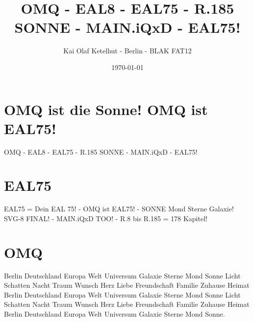 \documentclass[12pt]{article}
\title{OMQ - EAL8 - EAL75 - R.185 SONNE - MAIN.iQxD - EAL75!}
\author{Kai Olaf Ketelhut - Berlin - BLAK FAT12}
\date{\today}
\begin{document}
\maketitle
\section*{OMQ ist die Sonne! OMQ ist EAL75!}
OMQ - EAL8 - EAL75 - R.185 SONNE - MAIN.iQxD - EAL75!

\section*{EAL75}
EAL75 = Dein EAL 75! - OMQ ist EAL75! - SONNE Mond Sterne Galaxie!
SVG-8 FINAL! - MAIN.iQxD TOO! - R.8 bis R.185 = 178 Kapitel!

\section*{OMQ}
Berlin Deutschland Europa Welt Universum Galaxie Sterne Mond Sonne
Licht Schatten Nacht Traum Wunsch Herz Liebe Freundschaft Familie
Zuhause Heimat Berlin Deutschland Europa Welt Universum Galaxie
Sterne Mond Sonne Licht Schatten Nacht Traum Wunsch Herz Liebe
Freundschaft Familie Zuhause Heimat Berlin Deutschland Europa Welt
Universum Galaxie Sterne Mond Sonne.
\end{document}
